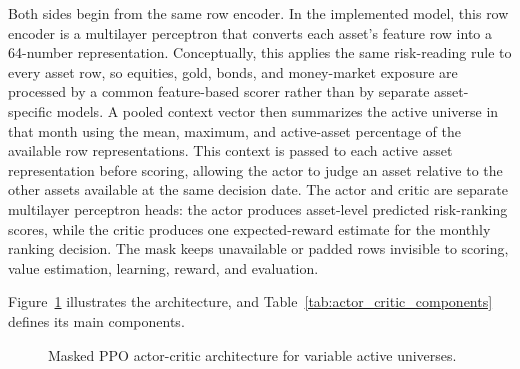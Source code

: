Both sides begin from the same row encoder. In the implemented model, this row encoder is a multilayer perceptron that converts each asset's feature row into a 64-number representation. Conceptually, this applies the same risk-reading rule to every asset row, so equities, gold, bonds, and money-market exposure are processed by a common feature-based scorer rather than by separate asset-specific models. A pooled context vector then summarizes the active universe in that month using the mean, maximum, and active-asset percentage of the available row representations. This context is passed to each active asset representation before scoring, allowing the actor to judge an asset relative to the other assets available at the same decision date. The actor and critic are separate multilayer perceptron heads: the actor produces asset-level predicted risk-ranking scores, while the critic produces one expected-reward estimate for the monthly ranking decision. The mask keeps unavailable or padded rows invisible to scoring, value estimation, learning, reward, and evaluation.

Figure~\ref{fig:actor_critic} illustrates the architecture, and Table~\ref{tab:actor_critic_components} defines its main components.

\begin{figure}[H]
\centering
{}
\caption{Masked PPO actor-critic architecture for variable active universes.}
\label{fig:actor_critic}
\end{figure}

